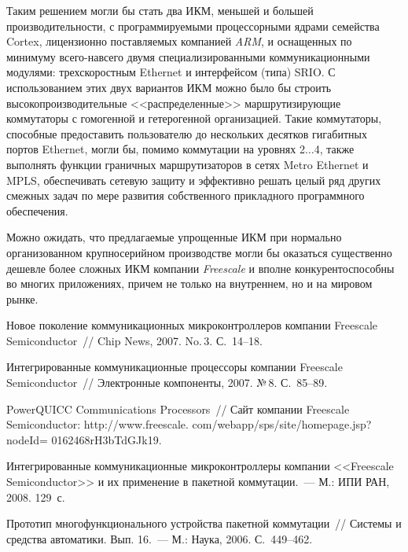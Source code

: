 \begin{multicols}{2}
     Таким решением могли бы стать два ИКМ, меньшей и большей производительности, с 
программируемыми процессорными ядрами семейства Cortex, лицензионно поставляемых 
компанией \textit{ARM}, и оснащенных по минимуму все\-го-на\-всего двумя 
специализированными коммуникационными модулями: трехскоростным Ethernet и 
интерфейсом (типа) SRIO. С использованием этих двух вариантов ИКМ можно было бы 
строить высокопроизводительные <<распределенные>> маршрутизирующие коммутаторы с 
гомогенной и гетерогенной %
организацией. Такие коммутаторы, способные предо\-ста\-вить 
пользователю до нескольких десятков гигабитных портов Ethernet, могли бы, помимо 
коммутации на уровнях 2$\ldots$4, также выполнять %
функции граничных маршрутизаторов в 
\mbox{сетях} Metro Ethernet и MPLS, обеспечивать сетевую защиту и эффективно решать целый ряд 
других смежных задач по мере развития собственного прикладного программного 
обеспечения.
     
     Можно ожидать, что предлагаемые упрощенные ИКМ при нормально организованном 
крупносерийном производстве могли бы оказаться существенно дешевле более сложных 
ИКМ компании \textit{Freescale} и вполне конкурентоспособны во многих приложениях, 
причем не только на внутреннем, но и на мировом рынке.

{\small\frenchspacing
{%
\begin{thebibliography}{99}

Новое поколение коммуникационных микроконтроллеров компании Freescale 
Semiconductor~// Chip News, 2007. No.\,3. С.~14--18.

Интегрированные коммуникационные процессоры компании Freescale 
Semiconductor~// Электронные компоненты, 2007. №\,8. С.~85--89.

PowerQUICC Communications Processors~// Сайт компании Freescale Semiconductor: 
{\sf http://www.freescale. com/webapp/sps/site/homepage.jsp?nodeId= 0162468rH3bTdGJk19}.

Интегрированные коммуникационные микроконтроллеры компании <<Freescale 
Semiconductor>> и их применение в пакетной коммутации.~--- М.: ИПИ РАН, 2008.  129~с.

Прототип многофункционального 
устройства пакетной коммутации~// Системы и средства автоматики. Вып. 16.~--- М.: Наука, 
2006. С.~449--462.


\end{thebibliography}}}
\end{multicols}
